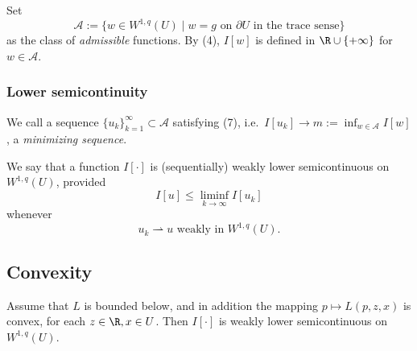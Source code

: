 \begin{definition}
\label{def:admissible-class-sobolev-minimization}
Set
\[
\mathcal{A} := \{w \in W^{1,q}(U) \mid w = g \text{ on } \partial U \text{ in the trace sense}\}
\]
as the class of \textit{admissible} functions. By (4), $I[w]$ is defined in
$\R\cup\{+\infty\}$ for $w\in\mathcal A$.
\end{definition}

\subsubsection{Lower semicontinuity}

\begin{definition}
\label{def:minimizing-sequence-calculus-of-variations}
We call a sequence $\{u_k\}_{k=1}^{\infty} \subset \mathcal{A}$ satisfying (7), i.e.\ $I[u_k]\to m := \inf_{w\in\mathcal{A}} I[w]$, a \textit{minimizing sequence}.
\end{definition}

\begin{definition}
\label{def:weakly-lower-semicontinuous-functional}
We say that a function $I[\cdot]$ is (sequentially) weakly lower semicontinuous on $W^{1,q}(U)$, provided
\[
I[u] \leq \liminf_{k \to \infty} I[u_k]
\]
whenever
\[
u_k \rightharpoonup u \text{ weakly in } W^{1,q}(U).
\]
\end{definition}

\subsection{Convexity}
\label{sec:convexity-lower-semicontinuity-existence}

\begin{theorem}
\label{thm:weak-lower-semicontinuity-convex-lagrangian}
Assume that $L$ is bounded below, and in addition the mapping $p \mapsto L(p,z,x)$ is convex, for each $z \in \R, x \in U$. Then $I[\cdot]$ is weakly lower semicontinuous on $W^{1,q}(U)$.
\end{theorem}

